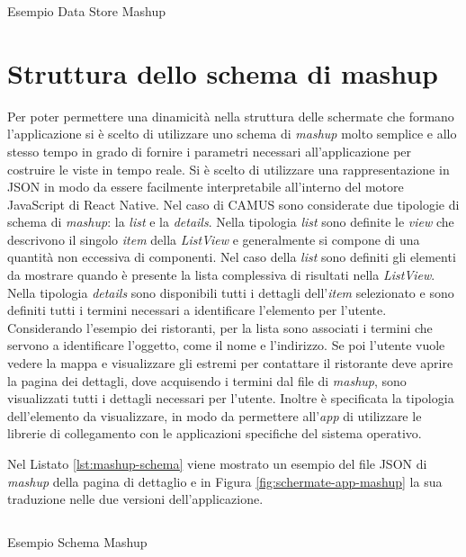 \begin{listing}[H]
	\inputminted{json}{4-progettazione-alto-livello/Codice/store-two-topics.json}
	\caption{Esempio Data Store Mashup}
	\label{lst:store-two-topics}
\end{listing}

\section{Struttura dello schema di mashup\label{sec:struttura-schemi-mashup}}

Per poter permettere una dinamicità nella struttura delle schermate che formano l'applicazione si è scelto di utilizzare uno schema di \emph{mashup} molto semplice e allo stesso tempo in grado di fornire i parametri necessari all'applicazione per costruire le viste in tempo reale. Si è scelto di utilizzare una rappresentazione in JSON in modo da essere facilmente interpretabile all'interno del motore JavaScript di React Native. 
Nel caso di CAMUS sono considerate due tipologie di schema di \emph{mashup}: la \emph{list} e la \emph{details}. 
Nella tipologia \emph{list} sono definite le \emph{view} che descrivono il singolo \emph{item} della \emph{ListView} e generalmente si compone di una quantità non eccessiva di componenti. 
Nel caso della \emph{list} sono definiti gli elementi da mostrare quando è presente la lista complessiva di risultati nella \emph{ListView}.
Nella tipologia \emph{details} sono disponibili tutti i dettagli dell'\emph{item} selezionato e sono definiti tutti i termini necessari a identificare l'elemento per l'utente.
Considerando l'esempio dei ristoranti, per la lista sono associati i termini che servono a identificare l'oggetto, come il nome e l'indirizzo. Se poi l'utente vuole vedere la mappa e visualizzare gli estremi per contattare il ristorante deve aprire la pagina dei dettagli, dove acquisendo i termini dal file di \emph{mashup}, sono visualizzati tutti i dettagli necessari per l'utente. Inoltre è specificata la tipologia dell'elemento da visualizzare, in modo da permettere all'\emph{app} di utilizzare le librerie di collegamento con le applicazioni specifiche del sistema operativo.

Nel Listato \ref{lst:mashup-schema} viene mostrato un esempio del file JSON di \emph{mashup} della pagina di dettaglio e in Figura \ref{fig:schermate-app-mashup} la sua traduzione nelle due versioni dell'applicazione.

\begin{listing}[H]
	\inputminted{json}{6-implementazione-app/Codice/mashup-schema-example-app.json}
	\caption{Esempio Schema Mashup}
	\label{lst:mashup-schema}
\end{listing}

